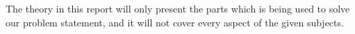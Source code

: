 

The theory in this report will only present the parts which is being used to solve our problem statement, and it will not cover every aspect of the given subjects.